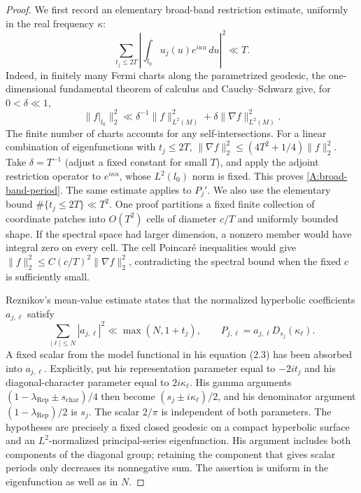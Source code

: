 \begin{proof}
We first record an elementary broad-band restriction estimate, uniformly
in the real frequency $\kappa$:
\begin{equation}\label{A:broad-band-period}
 \sum_{t_j\leq2T}\left|\int_{l_0}u_j(u)e^{i\kappa u}\,du\right|^2
       \ll T.
\end{equation}
Indeed, in finitely many Fermi charts along the parametrized geodesic,
the one-dimensional fundamental theorem of calculus and Cauchy--Schwarz
give, for $0<\delta\ll1$,
\[
 \|f|_{l_0}\|_2^2\ll
 \delta^{-1}\|f\|_{L^2(M)}^2+
 \delta\|\nabla f\|_{L^2(M)}^2.
\]
The finite number of charts accounts for any self-intersections.
For a linear combination of eigenfunctions with $t_j\leq2T$,
$\|\nabla f\|_2^2\leq(4T^2+1/4)\|f\|_2^2$.
Take $\delta=T^{-1}$ (adjust a fixed constant for small $T$), and
apply the adjoint restriction operator to $e^{i\kappa u}$, whose
$L^2(l_0)$ norm is fixed. This proves \eqref{A:broad-band-period}.
The same estimate applies to $P_j'$.
We also use the elementary bound $\#\{t_j\leq2T\}\ll T^2$.
One proof partitions a fixed finite collection of coordinate patches
into $O(T^2)$ cells of diameter $c/T$ and uniformly bounded shape.
If the spectral space had larger dimension, a nonzero member would
have integral zero on every cell. The cell Poincar\'e inequalities would
give $\|f\|_2^2\leq C(c/T)^2\|\nabla f\|_2^2$, contradicting the
spectral bound when the fixed $c$ is sufficiently small.

Reznikov's mean-value estimate
\cite[equation (1.13), proved in Sections 2.3 and 3.1--3.2]{Reznikov2015}
states that the normalized hyperbolic coefficients $a_{j,\ell}$ satisfy
\begin{equation}\label{A:Reznikov-mean}
 \sum_{|\ell|\leq N}|a_{j,\ell}|^2\ll\max(N,1+t_j),
 \qquad P_{j,\ell}=a_{j,\ell}D_{s_j}(\kappa_\ell).
\end{equation}
A fixed scalar from the model functional in his equation (2.3) has
been absorbed into $a_{j,\ell}$. Explicitly, put his representation
parameter equal to $-2it_j$ and his diagonal-character parameter equal
to $2i\kappa_\ell$. His gamma arguments
$(1-\lambda_{\mathrm{Rep}}\pm s_{\mathrm{char}})/4$ then become
$(s_j\pm i\kappa_\ell)/2$, and his denominator argument
$(1-\lambda_{\mathrm{Rep}})/2$ is $s_j$. The scalar $2/\pi$
is independent of both parameters. The hypotheses are precisely a fixed
closed geodesic on a compact hyperbolic surface and an $L^2$-normalized
principal-series eigenfunction. His argument includes both components
of the diagonal group; retaining the component that gives scalar
periods only decreases its nonnegative sum. The assertion is uniform
in the eigenfunction as well as in $N$.


\end{proof}
